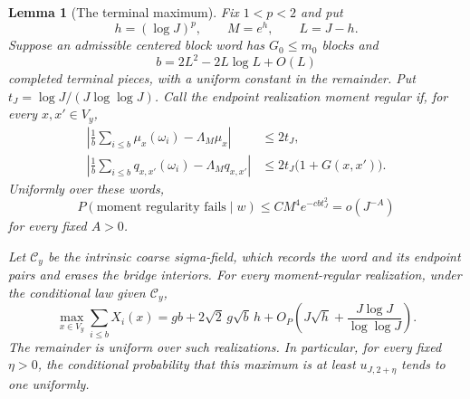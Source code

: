 \documentclass[12pt,reqno]{amsart}
\theoremstyle{plain}
\newtheorem{lemma}[theorem]{Lemma}
\theoremstyle{definition}
\theoremstyle{remark}
\numberwithin{equation}{section}
\begin{document}
\begin{lemma}[The terminal maximum]
\label{lem:terminal-maximum-lower}
Fix $1<p<2$ and put
\[
 h=(\log J)^p,\qquad M=e^h,\qquad L=J-h.
\]
Suppose an admissible centered block word has $G_0\le m_0$ blocks and
\begin{equation}
 b=2L^2-2L\log L+O(L)
 \label{eq:terminal-piece-count}
\end{equation}
completed terminal pieces, with a uniform constant in the remainder.
Put $t_J=\log J/(J\log\log J)$.  Call the endpoint realization
\emph{moment regular} if, for every $x,x'\in V_y$,
\begin{equation}
 \begin{split}
 \left|\frac1b\sum_{i\le b}\mu_x(\omega_i)-\Lambda_M\mu_x\right|
 &\le 2t_J,\\
 \left|\frac1b\sum_{i\le b}q_{x,x'}(\omega_i)
                    -\Lambda_Mq_{x,x'}\right|
 &\le 2t_J\bigl(1+G(x,x')\bigr).
 \end{split}
 \label{eq:terminal-moment-regularity}
\end{equation}
Uniformly over these words,
\begin{equation}
 P(\text{moment regularity fails}\mid w)
 \le CM^4e^{-cbt_J^2}=o(J^{-A})
 \label{eq:terminal-moment-failure}
\end{equation}
for every fixed $A>0$.

Let $\mathcal C_y$ be the intrinsic coarse sigma-field, which records
the word and its endpoint pairs and erases the bridge interiors.
For every moment-regular realization, under the conditional law given
$\mathcal C_y$,
\begin{equation}
 \max_{x\in V_y}\sum_{i\le b}X_i(x)
 =gb+2\sqrt2\,g\sqrt b\,h
 +O_P\left(J\sqrt h+\frac{J\log J}{\log\log J}\right).
 \label{eq:terminal-maximum-expansion}
\end{equation}
The remainder is uniform over such realizations.  In particular, for
every fixed $\eta>0$, the conditional probability that this maximum
is at least $u_{J,2+\eta}$ tends to one uniformly.
\end{lemma}
\end{document}
